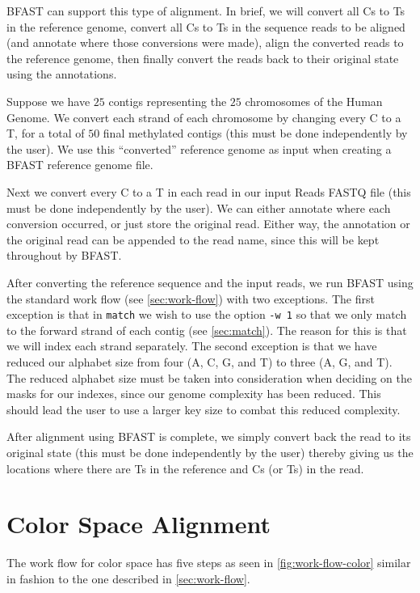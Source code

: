 \documentclass[a4paper,12pt]{book}
\newcommand{\TT}[1]{{\tt #1}} %
\newcommand{\RFF}{Reads FASTQ file}
\newcommand{\BRGF}{BFAST reference genome file} %
\begin{document}
BFAST can support this type of alignment.
In brief, we will convert all Cs to Ts in the reference genome, convert all Cs to Ts in the sequence reads to be aligned (and annotate where those conversions were made), align the converted reads to the reference genome, then finally convert the reads back to their original state using the annotations.

Suppose we have $25$ contigs representing the $25$ chromosomes of the Human Genome.
We convert each strand of each chromosome by changing every C to a T, for a total of $50$ final methylated contigs (this must be done independently by the user). 
We use this ``converted'' reference genome as input when creating a \BRGF{}.

Next we convert every C to a T in each read in our input \RFF{} (this must be done independently by the user). 
We can either annotate where each conversion occurred, or just store the original read.
Either way, the annotation or the original read can be appended to the read name, since this will be kept throughout by BFAST.

After converting the reference sequence and the input reads, we run BFAST using the standard work flow (see \autoref{sec:work-flow}) with two exceptions.
The first exception is that in \TT{match} we wish to use the option \TT{-w 1} so that we only match to the forward strand of each contig (see \autoref{sec:match}).
The reason for this is that we will index each strand separately.
The second exception is that we have reduced our alphabet size from four (A, C, G, and T) to three (A, G, and T).
The reduced alphabet size must be taken into consideration when deciding on the masks for our indexes, since our genome complexity has been reduced.
This should lead the user to use a larger key size to combat this reduced complexity.

After alignment using BFAST is complete, we simply convert back the read to its original state (this must be done independently by the user) thereby giving us the locations where there are Ts in the reference and Cs (or Ts) in the read.


\section{Color Space Alignment}
\label{sec:color-space-alignment}
The work flow for color space has five steps as seen in \autoref{fig:work-flow-color} similar in fashion to the one described in \autoref{sec:work-flow}.
\end{document}
